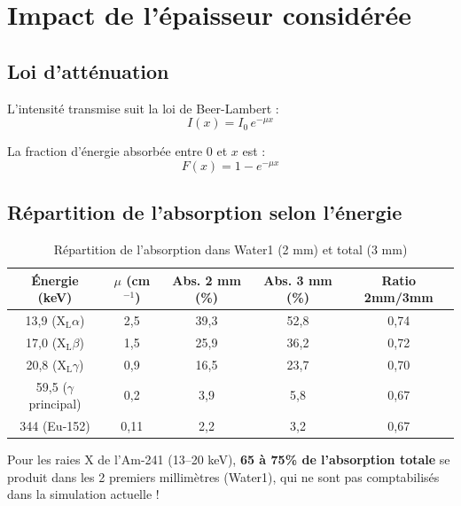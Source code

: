 \documentclass[11pt,a4paper]{article}
\begin{document}
\section{Impact de l'épaisseur considérée}

\subsection{Loi d'atténuation}

L'intensité transmise suit la loi de Beer-Lambert :
\begin{equation}
I(x) = I_0 \, e^{-\mu x}
\end{equation}

La fraction d'énergie absorbée entre 0 et $x$ est :
\begin{equation}
F(x) = 1 - e^{-\mu x}
\end{equation}

\subsection{Répartition de l'absorption selon l'énergie}

\begin{table}[h]
\centering
\begin{tabular}{ccccc}
\toprule
\rowcolor{headerblue!20}
\textbf{Énergie (keV)} & \textbf{$\mu$ (cm$^{-1}$)} & \textbf{Abs. 2 mm (\%)} & \textbf{Abs. 3 mm (\%)} & \textbf{Ratio 2mm/3mm} \\
\midrule
13,9 (X$_\text{L}\alpha$) & 2,5 & 39,3 & 52,8 & 0,74 \\
\rowcolor{lightgray}
17,0 (X$_\text{L}\beta$) & 1,5 & 25,9 & 36,2 & 0,72 \\
20,8 (X$_\text{L}\gamma$) & 0,9 & 16,5 & 23,7 & 0,70 \\
\rowcolor{lightgray}
59,5 ($\gamma$ principal) & 0,2 & 3,9 & 5,8 & 0,67 \\
\midrule
344 (Eu-152) & 0,11 & 2,2 & 3,2 & 0,67 \\
\bottomrule
\end{tabular}
\caption{Répartition de l'absorption dans Water1 (2 mm) et total (3 mm)}
\end{table}

\begin{warning}
Pour les raies X de l'Am-241 (13--20 keV), \textbf{65 à 75\% de l'absorption totale} se produit dans les 2 premiers millimètres (Water1), qui ne sont pas comptabilisés dans la simulation actuelle !
\end{warning}
\end{document}
